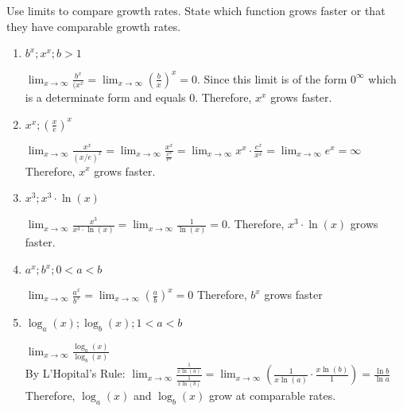 \documentclass[nooutcomes]{ximera}
\begin{document}
\begin{problem}
Use limits to compare growth rates.  State which function grows faster or that they have comparable growth rates.

\begin{enumerate}
	\item$b^x; x^x; b>1$
		\begin{freeResponse}
		$\lim_{x \to \infty}\frac{b^x}{(x^x}=\lim_{x \to \infty}\left(\frac{b}{x}\right)^x=0$.  Since this limit is of the form $0^{\infty}$ which is a determinate form and equals $0$.
		Therefore, $x^x$ grows faster.
		
		\end{freeResponse}
	
	\item $x^x; \left(\frac{x}{e}\right)^x$
		\begin{freeResponse}
		$\lim_{x \to \infty}\frac{x^x}{(x/e)^x}=\lim_{x \to \infty}\frac{x^x}{\frac{x^x}{e^x}}=\lim_{x \to \infty}{x^x}\cdot{\frac{e^x}{x^x}}=\lim_{x \to \infty}{e^x}=\infty$  Therefore, $x^x$ grows faster.
		
		\end{freeResponse}
	

	
	\item $x^3; x^3 \cdot \ln(x)$
		\begin{freeResponse}
		$\lim_{x \to \infty}\frac{x^3}{x^3 \cdot \ln(x)}=\lim_{x \to \infty}\frac{1}{\ln(x)}=0$.  
		Therefore, $x^3 \cdot \ln(x)$ grows faster.
		
		\end{freeResponse}
	\item $a^x; b^x; 0<a<b$
	\begin{freeResponse}
		$\lim_{x \to \infty}\frac{a^x}{b^x}=\lim_{x \to \infty}\left(\frac{a}{b}\right)^x=0$
		Therefore, $b^x$ grows faster
	
	
	\end{freeResponse}
	\item $\log_a(x); \log_b(x); 1<a<b$
	\begin{freeResponse}
	$\lim_{x \to \infty}\frac{\log_a(x)}{\log_b(x)}$\\
	By L'Hopital's Rule: $\lim_{x \to \infty}\frac{\frac{1}{x\ln(a)}}{\frac{1}{x\ln(b)}}=\lim_{x \to \infty}\left(\frac{1}{x\ln(a)} \cdot \frac{x\ln(b)}{1}\right)=\frac{\ln b}{\ln a}$\\
	Therefore, $\log_a(x)$ and $\log_b(x)$ grow at comparable rates.
	

\end{freeResponse}
\end{enumerate}
\end{problem}
\end{document}
